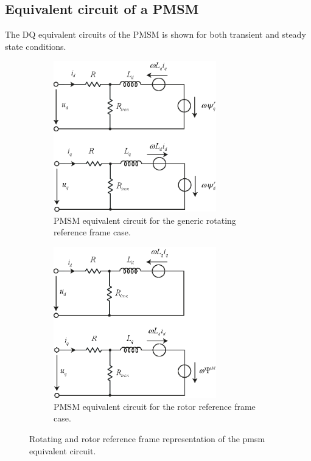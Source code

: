 \documentclass[11pt,a4paper]{article}
\numberwithin{equation}{section}
\theoremstyle{it}
\theoremstyle{definition}
\begin{document}
\begin{onehalfspace}
\subsection{Equivalent circuit of a PMSM}
The DQ equivalent circuits of the PMSM is shown for both transient and steady state conditions.
\begin{figure}[H]
	\centering
	\begin{subfigure}{.5\textwidth}
		\centering
		\includegraphics[width = 200pt, keepaspectratio]{figures/pmsm/pmsm_electrical_equivalent_1.eps}
		\captionsetup{width=0.5\textwidth, font=small}		
		\caption{PMSM equivalent circuit for the generic rotating reference frame case.}
		\label{}
	\end{subfigure}%
	\begin{subfigure}{.5\textwidth}
		\centering
		\includegraphics[width = 200pt, keepaspectratio]{figures/pmsm/pmsm_electrical_equivalent_2.eps}
		\captionsetup{width=0.5\textwidth, font=small}		
		\caption{PMSM equivalent circuit for the rotor reference frame case.}
		\label{}
	\end{subfigure}
	\captionsetup{width=0.5\textwidth, font=small}		
	\caption{Rotating and rotor reference frame representation of the pmsm equivalent circuit.}
	\label{pmsm_equivalent_circuit}
\end{figure}


\end{onehalfspace}
\end{document}
